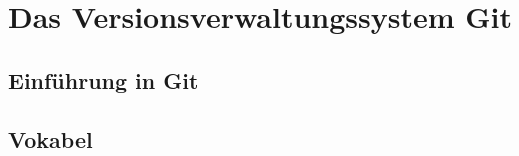 \documentclass[ngerman,paper=a4,fontsize=8pt,headings=small,draft=no,parskip=half,noonelinecaption]{scrreprt}
\begin{document}
\chapter{Das Versionsverwaltungssystem Git}
%  
% 
% 

\section{Einführung in Git}

\section{Vokabel}
\end{document}
